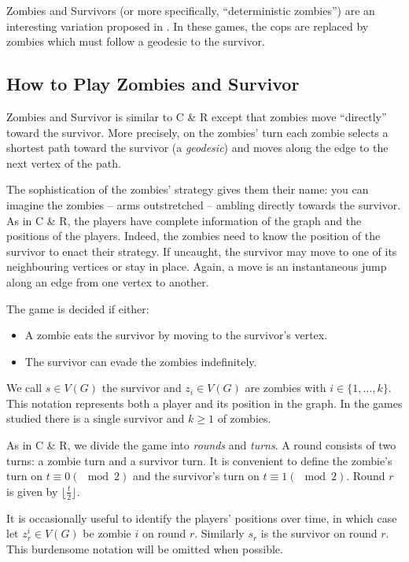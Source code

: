 Zombies and Survivors (or more specifically, ``deterministic zombies'') are an interesting variation proposed in \cite{fitzpatrick2016deterministic}. In these games, the
cops are replaced by zombies which must follow a geodesic to the survivor.

\subsection{How to Play Zombies and Survivor}

Zombies and Survivor is similar to C \& R except that zombies move
``directly'' toward the survivor. More precisely, on the zombies' turn
each zombie selects a shortest path toward the survivor (a \textit{geodesic})
and moves along the edge to the next vertex of the path.

The sophistication of the zombies' strategy gives them their name:
you can imagine the zombies -- arms outstretched -- ambling directly towards the survivor.
As in C \& R, the players have complete information of the graph and the positions of the players. Indeed, the zombies need to know the position of the survivor to enact
their strategy. If uncaught, the survivor may move to one of its neighbouring vertices or stay in place. Again, a move is an instantaneous jump along an edge from one vertex to another.

The game is decided if either:
\begin{itemize}
\item A zombie eats the survivor by moving to the survivor's vertex.
\item The survivor can evade the zombies indefinitely.
\end{itemize}

We call $s \in V(G)$ the survivor and $z_i \in V(G)$ are zombies with $i \in \{1, \dots, k\}$.
This notation represents both a player and its position in the graph.
In the games studied there is a single survivor and $k \geq 1$ of zombies.

As in C \& R, we divide the game into \textit{rounds} and \textit{turns}. A round consists of two turns: a zombie turn and a survivor turn.
It is convenient to define the zombie's turn on $t \equiv 0 (\mod{2})$ and the survivor's turn on $t \equiv 1 (\mod{2})$.
Round $r$ is given by $\lfloor \frac{t}{2} \rfloor$.

It is occasionally useful to identify the players' positions over time, in which
case let $z_r^i \in V(G)$ be zombie $i$ on round $r$. Similarly $s_r$ is the
survivor on round $r$. This burdensome notation will be omitted when possible.

